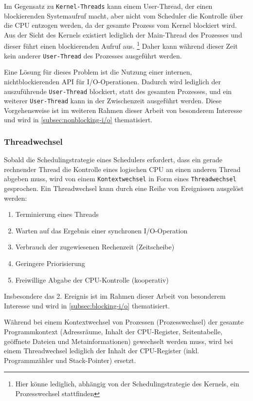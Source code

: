 Im Gegensatz zu \verb|Kernel-Threads| kann einem User-Thread, der einen blockierenden Systemaufruf macht, aber nicht vom Scheduler die Kontrolle über die CPU
entzogen werden, da der gesamte Prozess vom Kernel blockiert wird. Aus der Sicht des Kernels existiert lediglich der Main-Thread des Prozesses und dieser
führt einen blockierenden Aufruf aus. \footnote{Hier könne lediglich, abhängig von der Schedulingstrategie des Kernels, ein Prozesswechsel stattfinden}
Daher kann während dieser Zeit kein anderer \verb|User-Thread| des Prozesses ausgeführt werden.

Eine Lösung für dieses Problem ist die Nutzung einer internen, nichtblockierenden API für I/O-Operationen. Dadurch wird lediglich der
auszuführende \verb|User-Thread| blockiert, statt des gesamten Prozesses, und ein weiterer \verb|User-Thread| kann in der Zwischenzeit ausgeführt werden.
\parencite[Kapitel 2.2.4 Implementing Threads in User Space]{Tanenbaum2016}
Diese Vorgehensweise ist im weiteren Rahmen dieser Arbeit von besonderem Interesse und wird in \ref{subsec:nonblocking-i/o} thematisiert.

\subsubsection{Threadwechsel}
\label{subsubsec:threadwechsel}
Sobald die Schedulingstrategie eines Schedulers erfordert, dass ein gerade rechnender Thread die Kontrolle eines logischen CPU an
einen anderen Thread abgeben muss, wird von einem \verb|Kontextwechsel| in Form eines \verb|Threadwechsel| gesprochen.
Ein Threadwechsel kann durch eine Reihe von Ereignissen ausgelöst werden:
\begin{enumerate}
	\item Terminierung eines Threads
	\item Warten auf das Ergebnis einer synchronen I/O-Operation
	\item Verbrauch der zugewiesenen Rechenzeit (Zeitscheibe)
	\item Geringere Priorisierung
	\item Freiwillige Abgabe der CPU-Kontrolle (kooperativ)
\end{enumerate}

Insbesondere das 2. Ereignis ist im Rahmen dieser Arbeit von besonderem Interesse und wird in \ref{subsec:blocking-i/o} thematisiert.

Während bei einem Kontextwechsel von Prozessen (Prozesswechsel) der gesamte Programmkontext (Adressräume, Inhalt der CPU-Register,
Seitentabelle, geöffnete Dateien und Metainformationen)
gewechselt werden muss, wird bei einem Threadwechsel lediglich der Inhalt der CPU-Register (inkl. Programmzähler und Stack-Pointer)
ersetzt.\parencite{Mosberger2002}

